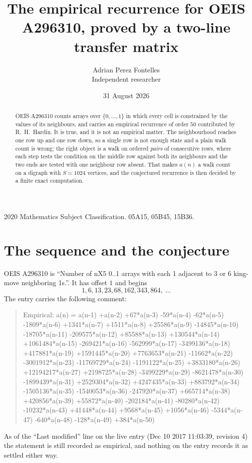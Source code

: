 \documentclass[11pt,a4paper]{article}
\title{The empirical recurrence for OEIS A296310, proved by a two-line transfer matrix}
\author{Adrian Perez Fontelles\\ \small Independent researcher}
\date{31 August 2026}
\theoremstyle{plain}
\theoremstyle{definition}
\begin{document}
\maketitle

\begin{abstract}
OEIS A296310 counts arrays over $\{0,\dots,1\}$ in which every cell is constrained by the
values of its neighbours, and carries an empirical recurrence of order $50$ contributed
by R.~H.~Hardin. It is true, and it is not an empirical matter. The neighbourhood reaches one
row up and one row down, so a single row is not enough state and a plain walk count
is wrong; the right object is a walk on ordered \emph{pairs} of consecutive rows, where
each step tests the condition on the middle row against both its neighbours and the two
ends are tested with one neighbour row absent. That makes $a(n)$ a walk count on a digraph
with $S=1024$ vertices, and the conjectured recurrence is then decided by a finite exact
computation.
\end{abstract}

\noindent\small 2020 Mathematics Subject Classification. 05A15, 05B45, 15B36.\normalsize

\section{The sequence and the conjecture}

OEIS A296310 is ``Number of nX5 0..1 arrays with each 1 adjacent to 3 or 6 king-move neighboring 1s.''. It has offset $1$ and begins
\[
1, 6, 13, 23, 68, 162, 343, 864,\ \dots
\]
The entry carries the following comment:
\begin{quote}\small
Empirical: a(n) = a(n-1) +a(n-2) +67*a(n-3) -59*a(n-4) -62*a(n-5) -1809*a(n-6) +1341*a(n-7) +1511*a(n-8) +25586*a(n-9) -14845*a(n-10) -18705*a(n-11) -209575*a(n-12) +85588*a(n-13) +130544*a(n-14) +1061484*a(n-15) -269421*a(n-16) -562999*a(n-17) -3499136*a(n-18) +417881*a(n-19) +1591445*a(n-20) +7763653*a(n-21) -11662*a(n-22) -3001912*a(n-23) -11769729*a(n-24) -1191122*a(n-25) +3833180*a(n-26) +12194217*a(n-27) +2198725*a(n-28) -3499229*a(n-29) -8621478*a(n-30) -1899439*a(n-31) +2529304*a(n-32) +4247435*a(n-33) +883792*a(n-34) -1505136*a(n-35) -1540053*a(n-36) -247920*a(n-37) +665714*a(n-38) +420856*a(n-39) +55872*a(n-40) -202184*a(n-41) -80280*a(n-42) -10232*a(n-43) +41448*a(n-44) +9568*a(n-45) +1056*a(n-46) -5344*a(n-47) -640*a(n-48) -128*a(n-49) +384*a(n-50)
\end{quote}
As of the ``Last modified'' line on the live entry (Dec 10 2017 11:03:39, revision 4) the statement is
still recorded as empirical, and nothing on the entry records it as settled either way.
\end{document}
